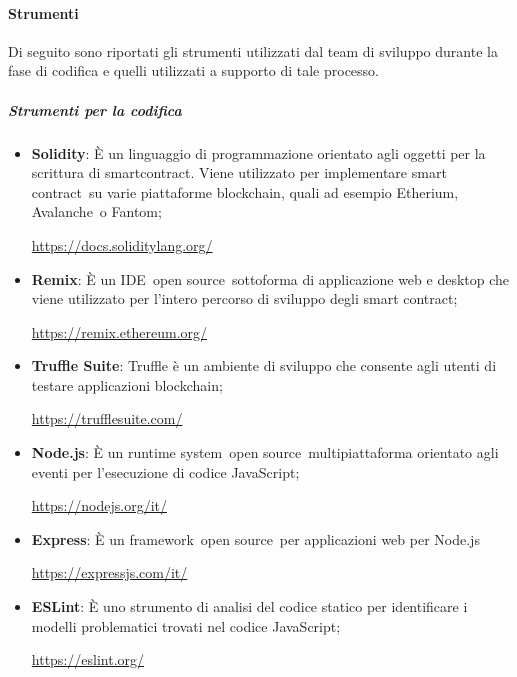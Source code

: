        \paragraph{Strumenti}    \label{paragraph:Strumenti}
        Di seguito sono riportati gli strumenti utilizzati dal team di sviluppo durante la fase di codifica e quelli utilizzati a supporto di tale processo.
        \subparagraph{Strumenti per la codifica}
        \begin{itemize}
            \item \textbf{Solidity}: È un linguaggio di programmazione orientato agli oggetti per la scrittura di smartcontract\glo . Viene utilizzato per implementare smart contract\glo\ su varie piattaforme blockchain\glo , quali ad esempio Etherium\glo , Avalanche\glo\ o Fantom\glo;
            \begin{center}\url{https://docs.soliditylang.org/}\end{center}
            \item \textbf{Remix}: È un IDE\glo\ open source\glo\ sottoforma di applicazione web e desktop che viene utilizzato per l'intero percorso di sviluppo degli smart contract\glo ;
            \begin{center}\url{https://remix.ethereum.org/}\end{center}
            \item \textbf{Truffle Suite}: 
            Truffle è un ambiente di sviluppo che consente agli utenti di testare applicazioni blockchain\glo;
            \begin{center}\url{https://trufflesuite.com/}\end{center}
            \item \textbf{Node.js}: È un runtime system\glo\ open source\glo\ multipiattaforma orientato agli eventi per l'esecuzione di codice JavaScript\glo ;
            \begin{center}\url{https://nodejs.org/it/}\end{center}
            \item \textbf{Express}: È un framework\glo\ open source\glo\ per applicazioni web per Node.js
            \begin{center}\url{https://expressjs.com/it/}\end{center}
            \item \textbf{ESLint}: È uno strumento di analisi del codice statico per identificare i modelli problematici trovati nel codice JavaScript\glo ;
            \begin{center}\url{https://eslint.org/}\end{center}

\end{itemize}
